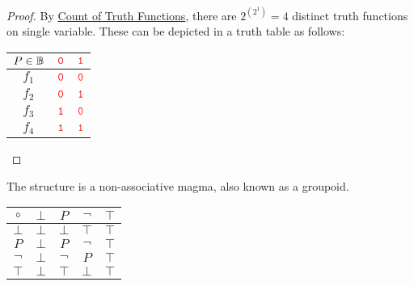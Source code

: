 \begin{proof}
	By \hyperlink{prop-A11}{Count of Truth Functions}, there are $2^{(2^1)}=4$
	distinct truth functions on single variable. These can be depicted in a truth table as follows:
	\begin{table}[h!]\centering
		\begin{tabular}{|c|cc|}
			\hline
			$P\in\mathbb{B}$ & $\textcolor{red}{\texttt 0}$ & $\textcolor{red}{\texttt 1}$ \\ \hline
			$f_1$ & $\textcolor{red}{\texttt 0}$ & $\textcolor{red}{\texttt 0}$ \\ \hline
			$f_2$ & $\textcolor{red}{\texttt 0}$ & $\textcolor{red}{\texttt 1}$ \\ \hline
			$f_3$ & $\textcolor{red}{\texttt 1}$ & $\textcolor{red}{\texttt 0}$ \\ \hline
			$f_4$ & $\textcolor{red}{\texttt 1}$ & $\textcolor{red}{\texttt 1}$ \\\hline
		\end{tabular}
	\end{table}
	
\end{proof}
\begin{remark}
The structure is a non-associative magma, also known as a groupoid. \begin{table}[h!]\centering
	\begin{tabular}{c||c|c|c|c}
		$\circ$ & $\bot$ & $P$ & $\lnot$ & $\top$ \\ \hline\hline
		$\bot$ & $\bot$ & $\bot$ & $\top$ & $\top$ \\ \hline
		$P$ & $\bot$ & $P$ & $\lnot$ & $\top$ \\ \hline
		$\lnot$ & $\bot$ & $\lnot$ & $P$ & $\top$ \\ \hline
		$\top$ & $\bot$ & $\top$ & $\bot$ & $\top$
	\end{tabular}
\end{table}
\end{remark}



